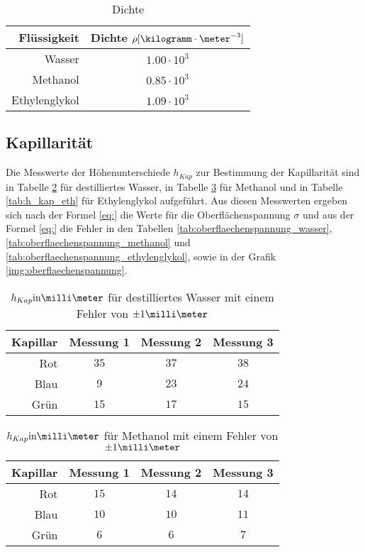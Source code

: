\documentclass[12pt, a4paper, twoside]{scrartcl}
\begin{document}
\begin{table}
\centering
\begin{tabular}{r|c}
    Flüssigkeit & Dichte $\rho [\kilogramm\cdot\meter^{-3}]$\\
    \hline
    Wasser & $1.00\cdot 10^{3}$\\
    \hline
    Methanol & $ 0.85\cdot 10^{3}$\\
    \hline
    Ethylenglykol & $ 1.09 \cdot 10^{3}$\\
    
 \end{tabular} 
 \caption{\label{tab:dichte}Dichte}
\end{table}

\subsection{Kapillarität}

Die Messwerte der Höhenunterschiede $h_{Kap}$ zur Bestimmung der Kapillarität sind in Tabelle \ref{tab:h_kap_was} für destilliertes Wasser, in Tabelle \ref{tab:h_kap_met} für Methanol und in Tabelle \ref{tab:h_kap_eth} für Ethylenglykol aufgeführt.
Aus diesen Messwerten ergeben sich nach der Formel \eqref{eq:} die Werte für die Oberflächenspannung $\sigma$ und aus der Formel \eqref{eq:} die Fehler in den Tabellen \ref{tab:oberflaechenspannung_wasser}, \ref{tab:oberflaechenspannung_methanol} und \ref{tab:oberflaechenspannung_ethylenglykol}, sowie in der Grafik \ref{img:oberflaechenspannung}.

\begin{table}
\centering
\begin{tabular}{r|c|c|c}
    Kapillar & Messung 1 & Messung 2 & Messung 3\\
    \hline
    Rot & $35$ & $37$ & $38$ \\
    Blau & $9$ & $23$ & $24$ \\
    Grün & $15$ & $17$ & $15$ \\
    
 \end{tabular} 
 \caption{\label{tab:h_kap_was}$h_{Kap} \rm{in} \milli\meter$ für destilliertes Wasser mit einem Fehler von $\pm 1\milli\meter$}
\end{table}

\begin{table}
\centering
\begin{tabular}{r|c|c|c}
    Kapillar & Messung 1 & Messung 2 & Messung 3\\
    \hline
    Rot & $15$ & $14$ & $14$\\
    Blau & $10$ & $10$ & $11$ \\
    Grün & $6$ & $6$ & $7$\\
    
 \end{tabular} 
 \caption{\label{tab:h_kap_met}$h_{Kap} \rm{in} \milli\meter$ für Methanol mit einem Fehler von $\pm 1\milli\meter$}
\end{table}
\end{document}
